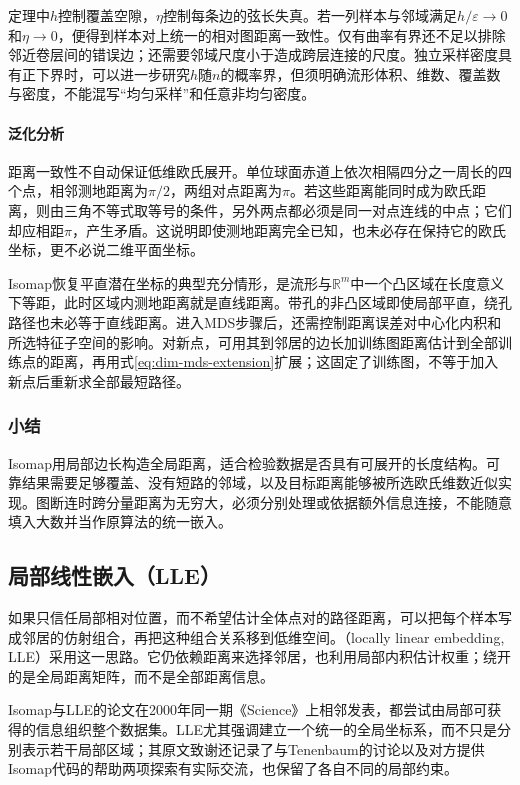 定理中$h$控制覆盖空隙，$\eta$控制每条边的弦长失真。若一列样本与邻域满足$h/\varepsilon\to0$和$\eta\to0$，便得到样本对上统一的相对图距离一致性。仅有曲率有界还不足以排除邻近卷层间的错误边；还需要邻域尺度小于造成跨层连接的尺度。独立采样密度具有正下界时，可以进一步研究$h$随$n$的概率界，但须明确流形体积、维数、覆盖数与密度，不能混写“均匀采样”和任意非均匀密度。

\paragraph{泛化分析}

距离一致性不自动保证低维欧氏展开。单位球面赤道上依次相隔四分之一周长的四个点，相邻测地距离为$\pi/2$，两组对点距离为$\pi$。若这些距离能同时成为欧氏距离，则由三角不等式取等号的条件，另外两点都必须是同一对点连线的中点；它们却应相距$\pi$，产生矛盾。这说明即使测地距离完全已知，也未必存在保持它的欧氏坐标，更不必说二维平面坐标。

Isomap恢复平直潜在坐标的典型充分情形，是流形与$\mathbb{R}^m$中一个凸区域在长度意义下等距，此时区域内测地距离就是直线距离。带孔的非凸区域即使局部平直，绕孔路径也未必等于直线距离。进入MDS步骤后，还需控制距离误差对中心化内积和所选特征子空间的影响。对新点，可用其到邻居的边长加训练图距离估计到全部训练点的距离，再用式\eqref{eq:dim-mds-extension}扩展；这固定了训练图，不等于加入新点后重新求全部最短路径。

\subsubsection{小结}

Isomap用局部边长构造全局距离，适合检验数据是否具有可展开的长度结构。可靠结果需要足够覆盖、没有短路的邻域，以及目标距离能够被所选欧氏维数近似实现。图断连时跨分量距离为无穷大，必须分别处理或依据额外信息连接，不能随意填入大数并当作原算法的统一嵌入。

\subsection{局部线性嵌入（LLE）}
\label{sec:dim-lle}

如果只信任局部相对位置，而不希望估计全体点对的路径距离，可以把每个样本写成邻居的仿射组合，再把这种组合关系移到低维空间。（locally linear embedding, LLE）采用这一思路。它仍依赖距离来选择邻居，也利用局部内积估计权重；绕开的是全局距离矩阵，而不是全部距离信息。

Isomap与LLE的论文在2000年同一期《Science》上相邻发表，都尝试由局部可获得的信息组织整个数据集。LLE尤其强调建立一个统一的全局坐标系，而不只是分别表示若干局部区域；其原文致谢还记录了与Tenenbaum的讨论以及对方提供Isomap代码的帮助两项探索有实际交流，也保留了各自不同的局部约束。


